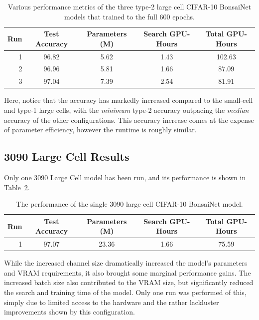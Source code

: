 \begin{table}[h]
\begin{center}
	\begin{tabular}{r|c|c|c|c}
	Run & Test Accuracy & Parameters (M) & Search GPU-Hours & Total GPU-Hours \\
	\hline
	1    & 96.82 & 5.62 & 1.43 & 102.63 \\
	2	 & 96.96 & 5.81 & 1.66 & 87.09\\
	3    & 97.04 & 7.39 & 2.54 & 81.91\\
	\end{tabular}
\end{center}
\caption[Various performance metrics of the three type-2 large cell CIFAR-10 BonsaiNet models]{Various performance metrics of the three type-2 large cell CIFAR-10 BonsaiNet models that trained to the full 600 epochs.}
\label{tab:large_cell_metricsv2}
\end{table}

Here, notice that the accuracy has markedly increased compared to the small-cell and type-1 large cells, with the \textit{minimum}
type-2 accuracy outpacing the \textit{median} accuracy of the other configurations. This accuracy increase comes at the
expense of parameter efficiency, however the runtime is roughly similar.

\subsection{3090 Large Cell Results}
Only one 3090 Large Cell model has been run, and its performance is shown in Table~\ref{tab:large_cell_metrics3090}.

\begin{table}[h]
\begin{center}
	\begin{tabular}{r|c|c|c|c}
	Run & Test Accuracy & Parameters (M) & Search GPU-Hours & Total GPU-Hours \\
	\hline
	1 	 & 97.07 & 23.36 & 1.66 & 75.59\\
	\end{tabular}
\end{center}
\caption[The performance of the single 3090 large cell CIFAR-10 BonsaiNet model]{The performance of the single 3090 large cell CIFAR-10 BonsaiNet model.}
\label{tab:large_cell_metrics3090}
\end{table}

While the increased channel size dramatically increased the model's parameters and VRAM requirements, it also brought
some marginal performance gains. The increased batch size also contributed to the VRAM size, but significantly
reduced the search and training time of the model. Only one run was performed of this, simply due to limited access to the hardware and
the rather lackluster improvements shown by this configuration.

